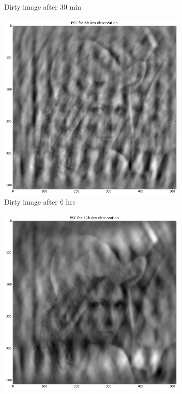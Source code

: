 \begin{figure}[ht!]
\begin{mdframed}
\begin{subfigure}[b]{0.34\textwidth}
  \caption{Dirty image after 30 min}
 \end{subfigure}
 \begin{subfigure}[b]{0.34\textwidth}
  \includegraphics[width=\textwidth]{images/evla_lena_observation/6hr.png}
  \caption{Dirty image after 6 hrs}
 \end{subfigure}
 \begin{subfigure}[b]{0.34\textwidth}
  \includegraphics[width=\textwidth]{images/evla_lena_observation/12hr.png}

\end{subfigure}
\end{mdframed}
\end{figure}

